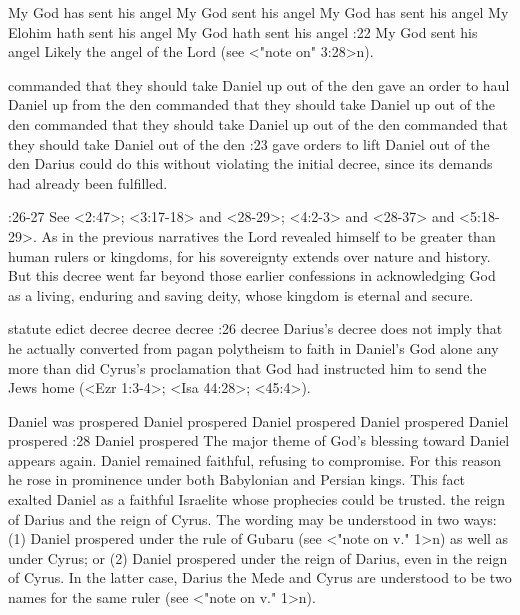     {My God has sent his angel} %
    {My God sent his angel} %
    {My God has sent his angel} %
    {My Elohim hath sent his angel} %
    {My God hath sent his angel} %
:22 {My God sent his angel} Likely the angel of the Lord (see <"note on" 3:28>n).

    {commanded that they should take Daniel up out of the den} %
    {gave an order to haul Daniel up from the den} %
    {commanded that they should take Daniel up out of the den} %
    {commanded that they should take Daniel up out of the den} %
    {commanded that they should take Daniel out of the den} %
:23 {gave orders to lift Daniel out of the den} Darius could do 
this without violating the initial decree, since its demands had already been fulfilled.

:26-27 {}  See <2:47>; <3:17-18> and <28-29>; <4:2-3> and <28-37> and <5:18-29>.
As in the previous narratives the
Lord revealed himself to be greater than human rulers or kingdoms, for his sovereignty extends over
nature and history. But this decree went far beyond those earlier confessions in acknowledging God
as a living, enduring and saving deity, whose kingdom is eternal and secure.

    {statute} %
    {edict} %
    {decree} %
    {decree} %
    {decree} %
:26 {decree} Darius's
decree does not imply that he actually converted from pagan polytheism to faith in Daniel's God
alone any more than did Cyrus's proclamation that God had instructed him to send the Jews home (<Ezr
1:3-4>; <Isa 44:28>; <45:4>).

    {Daniel was prospered} %
    {Daniel prospered} %
    {Daniel prospered} %
    {Daniel prospered} %
    {Daniel prospered} %
:28 {Daniel prospered} The major theme of God's blessing toward Daniel
appears again. Daniel remained faithful, refusing to compromise. For this reason he rose in
prominence under both Babylonian and Persian kings. This fact exalted Daniel as a faithful Israelite
whose prophecies could be trusted. the reign of Darius and the reign of Cyrus.
The wording may be understood in two ways: (1) Daniel prospered under the rule of Gubaru (see
<"note on v." 1>n) as well as under Cyrus; or (2) Daniel prospered under the reign of Darius, even in the
reign of Cyrus. In the latter case, Darius the Mede and Cyrus are understood to be two names for the
same ruler (see <"note on v." 1>n).

